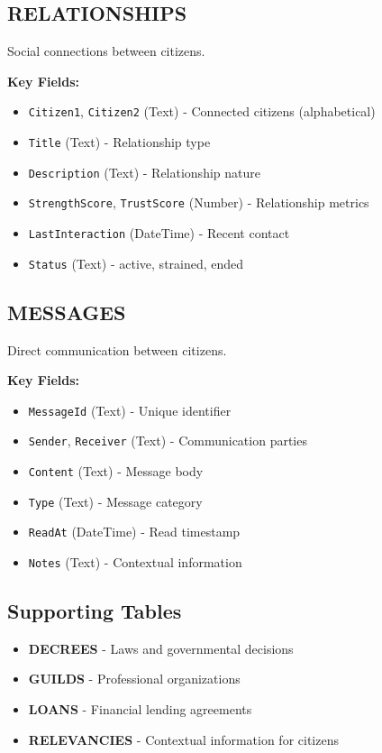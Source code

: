 \documentclass[11pt,a4paper]{article}
\begin{document}
\subsection{RELATIONSHIPS}

Social connections between citizens.

\textbf{Key Fields:}
\begin{itemize}
\item \texttt{Citizen1}, \texttt{Citizen2} (Text) - Connected citizens (alphabetical)
\item \texttt{Title} (Text) - Relationship type
\item \texttt{Description} (Text) - Relationship nature
\item \texttt{StrengthScore}, \texttt{TrustScore} (Number) - Relationship metrics
\item \texttt{LastInteraction} (DateTime) - Recent contact
\item \texttt{Status} (Text) - active, strained, ended
\end{itemize}

\subsection{MESSAGES}

Direct communication between citizens.

\textbf{Key Fields:}
\begin{itemize}
\item \texttt{MessageId} (Text) - Unique identifier
\item \texttt{Sender}, \texttt{Receiver} (Text) - Communication parties
\item \texttt{Content} (Text) - Message body
\item \texttt{Type} (Text) - Message category
\item \texttt{ReadAt} (DateTime) - Read timestamp
\item \texttt{Notes} (Text) - Contextual information
\end{itemize}

\subsection{Supporting Tables}

\begin{itemize}
\item \textbf{DECREES} - Laws and governmental decisions
\item \textbf{GUILDS} - Professional organizations
\item \textbf{LOANS} - Financial lending agreements
\item \textbf{RELEVANCIES} - Contextual information for citizens
\end{itemize}
\end{document}
